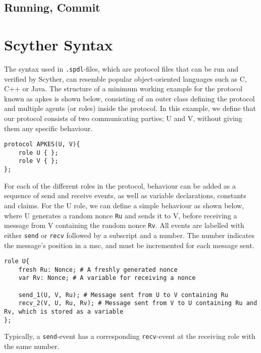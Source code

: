 \subsection{Running, Commit}





 
\section{Scyther Syntax}


The syntax used in \verb!.spdl!-files, which are protocol files that can be run and verified by Scyther, can resemble popular object-oriented languages such as C, C++ or Java. The structure of a minimum working example for the protocol known as \gls{apkes} is shown below, consisting of an outer class defining the protocol and multiple agents (or roles) inside the protocol. In this example, we define that our protocol consists of two communicating parties; U and V, without giving them any specific behaviour.

\begin{lstlisting}
protocol APKES(U, V){
	role U { };
	role V { };  
};
\end{lstlisting}


For each of the different roles in the protocol, behaviour can be added as a sequence of send and receive events, as well as variable declarations, constants and claims. For the U role, we can define a simple behaviour as shown below, where U generates a random nonce \texttt{Ru} and sends it to V, before receiving a message from V containing the random nonce \texttt{Rv}. All events are labelled with either \texttt{send} or \texttt{recv} followed by a subscript and a number. The number indicates the message's position in a \gls{msc}, and must be incremented for each message sent.


\begin{lstlisting}
role U{
	fresh Ru: Nonce; # A freshly generated nonce
	var Rv: Nonce; # A variable for receiving a nonce
	
	send_1(U, V, Ru); # Message sent from U to V containing Ru
	recv_2(V, U, Ru, Rv); # Message sent from V to U containing Ru and Rv, which is stored as a variable
};
\end{lstlisting}



Typically, a \texttt{send}-event has a corresponding \texttt{recv}-event at the receiving role with the same number.

